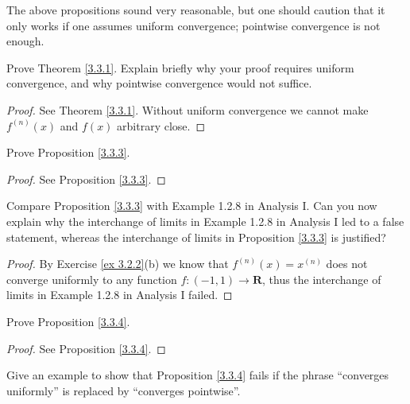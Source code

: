 \begin{remark}\label{3.3.7}
    The above propositions sound very reasonable, but one should caution that it only works if one assumes uniform convergence;
    pointwise convergence is not enough.
\end{remark}

\exercisesection

\begin{exercise}\label{ex 3.3.1}
    Prove Theorem \ref{3.3.1}.
    Explain briefly why your proof requires uniform convergence, and why pointwise convergence would not suffice.
\end{exercise}

\begin{proof}
    See Theorem \ref{3.3.1}.
    Without uniform convergence we cannot make \(f^{(n)}(x)\) and \(f(x)\) arbitrary close.
\end{proof}

\begin{exercise}\label{ex 3.3.2}
    Prove Proposition \ref{3.3.3}.
\end{exercise}

\begin{proof}
    See Proposition \ref{3.3.3}.
\end{proof}

\begin{exercise}\label{ex 3.3.3}
    Compare Proposition \ref{3.3.3} with Example 1.2.8 in Analysis I.
    Can you now explain why the interchange of limits in Example 1.2.8 in Analysis I led to a false statement, whereas the interchange of limits in Proposition \ref{3.3.3} is justified?
\end{exercise}

\begin{proof}
    By Exercise \ref{ex 3.2.2}(b) we know that \(f^{(n)}(x) = x^{(n)}\) does not converge uniformly to any function \(f : (-1, 1) \to \mathbf{R}\), thus the interchange of limits in Example 1.2.8 in Analysis I failed.
\end{proof}

\begin{exercise}\label{ex 3.3.4}
    Prove Proposition \ref{3.3.4}.
\end{exercise}

\begin{proof}
    See Proposition \ref{3.3.4}.
\end{proof}

\begin{exercise}\label{ex 3.3.5}
    Give an example to show that Proposition \ref{3.3.4} fails if the phrase ``converges uniformly'' is replaced by ``converges pointwise''.
\end{exercise}

